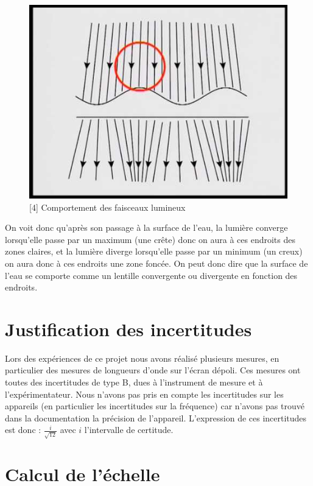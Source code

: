 \documentclass{report}
\begin{document}
\begin{figure}[H]
    \centering
    \includegraphics[scale=0.35]{zones.jpg}
    \caption{[4] Comportement des faisceaux lumineux}
    \label{fig:enter-label}
\end{figure}

On voit donc qu'après son passage à la surface de l'eau, la lumière converge lorsqu'elle passe par un maximum (une crête) donc on aura à ces endroits des zones claires, et la lumière diverge lorsqu'elle passe par un minimum (un creux) on aura donc à ces endroits une zone foncée. On peut donc dire que la surface de l'eau se comporte comme un lentille convergente ou divergente en fonction des endroits.

\section{Justification des incertitudes}
Lors des expériences de ce projet nous avons réalisé plusieurs mesures, en particulier des mesures de longueurs d'onde sur l'écran dépoli. Ces mesures ont toutes des incertitudes de type B, dues à l'instrument de mesure et à l'expérimentateur. Nous n'avons pas pris en compte les incertitudes sur les appareils (en particulier les incertitudes sur la fréquence) car n'avons pas trouvé dans la documentation la précision de l'appareil. L'expression de ces incertitudes est donc : $\frac{i}{\sqrt{12}}$ avec $i$ l'intervalle de certitude.

\section{Calcul de l'échelle}
\end{document}
